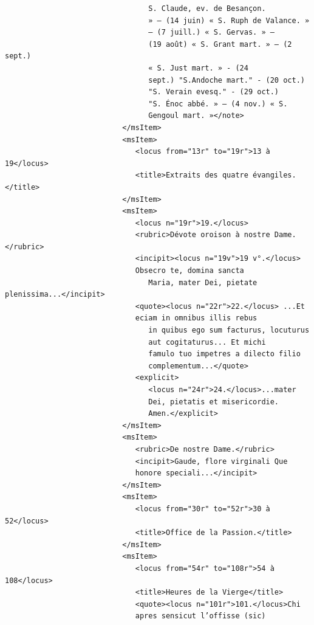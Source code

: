 \documentclass[a4paper,12pt,twoside]{book}
\begin{document}
\begin{verbatim}
                                 S. Claude, ev. de Besançon.
                                 » — (14 juin) « S. Ruph de Valance. » 
                                 — (7 juill.) « S. Gervas. » —
                                 (19 août) « S. Grant mart. » — (2 sept.)
                                 « S. Just mart. » - (24
                                 sept.) "S.Andoche mart." - (20 oct.)
                                 "S. Verain evesq." - (29 oct.)
                                 "S. Énoc abbé. » — (4 nov.) « S. 
                                 Gengoul mart. »</note>
                           </msItem>
                           <msItem>
                              <locus from="13r" to="19r">13 à 19</locus>
                              <title>Extraits des quatre évangiles.</title>
                           </msItem>
                           <msItem>
                              <locus n="19r">19.</locus>
                              <rubric>Dévote oroison à nostre Dame.</rubric>
                              <incipit><locus n="19v">19 v°.</locus>
                              Obsecro te, domina sancta
                                 Maria, mater Dei, pietate plenissima...</incipit>
                              <quote><locus n="22r">22.</locus> ...Et 
                              eciam in omnibus illis rebus
                                 in quibus ego sum facturus, locuturus 
                                 aut cogitaturus... Et michi
                                 famulo tuo impetres a dilecto filio 
                                 complementum...</quote>
                              <explicit>
                                 <locus n="24r">24.</locus>...mater
                                 Dei, pietatis et misericordie.
                                 Amen.</explicit>
                           </msItem>
                           <msItem>
                              <rubric>De nostre Dame.</rubric>
                              <incipit>Gaude, flore virginali Que 
                              honore speciali...</incipit>
                           </msItem>
                           <msItem>
                              <locus from="30r" to="52r">30 à 52</locus>
                              <title>Office de la Passion.</title>
                           </msItem>
                           <msItem>
                              <locus from="54r" to="108r">54 à 108</locus>
                              <title>Heures de la Vierge</title>
                              <quote><locus n="101r">101.</locus>Chi 
                              apres sensicut l’offisse (sic)

\end{verbatim}
\end{document}
